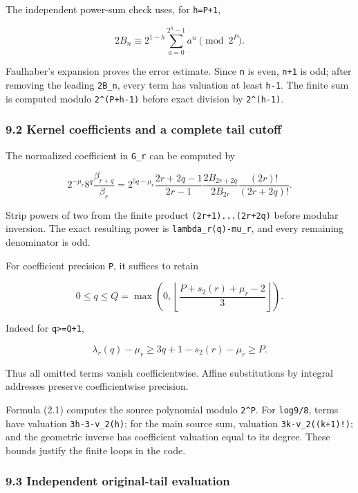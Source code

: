 \documentclass[11pt,letterpaper]{article}
\begin{document}
The independent power-sum check uses, for \texttt{h=P+1},

\[
2B_n\equiv2^{1-h}\sum_{a=0}^{2^h-1}a^n\pmod{2^P}.
\]

Faulhaber's expansion proves the error estimate. Since \texttt{n} is even, \texttt{n+1} is odd; after removing the leading \texttt{2B\_n}, every term has valuation at least \texttt{h-1}. The finite sum is computed modulo \texttt{2\^{}(P+h-1)} before exact division by \texttt{2\^{}(h-1)}.

\subsubsection{9.2 Kernel coefficients and a complete tail cutoff}\label{kernel-coefficients-and-a-complete-tail-cutoff}

The normalized coefficient in \texttt{G\_r} can be computed by

\[
2^{-\mu_r}8^q\frac{\beta_{r+q}}{\beta_r}
=2^{5q-\mu_r}\frac{2r+2q-1}{2r-1}
\frac{2B_{2r+2q}}{2B_{2r}}
\frac{(2r)!}{(2r+2q)!}. \tag{9.2}
\]

Strip powers of two from the finite product \texttt{(2r+1)...(2r+2q)} before modular inversion. The exact resulting power is \texttt{lambda\_r(q)-mu\_r}, and every remaining denominator is odd.

For coefficient precision \texttt{P}, it suffices to retain

\[
0\le q\le Q=\max\left(0,\left\lfloor
\frac{P+s_2(r)+\mu_r-2}{3}\right\rfloor\right). \tag{9.3}
\]

Indeed for \texttt{q\textgreater{}=Q+1},

\[
\lambda_r(q)-\mu_r\ge3q+1-s_2(r)-\mu_r\ge P.
\]

Thus all omitted terms vanish coefficientwise. Affine substitutions by integral addresses preserve coefficientwise precision.

Formula (2.1) computes the source polynomial modulo \texttt{2\^{}P}. For \texttt{log9/8}, terms have valuation \texttt{3h-3-v\_2(h)}; for the main source sum, valuation \texttt{3k-v\_2((k+1)!)}; and the geometric inverse has coefficient valuation equal to its degree. These bounds justify the finite loops in the code.

\subsubsection{9.3 Independent original-tail evaluation}\label{independent-original-tail-evaluation}
\end{document}

